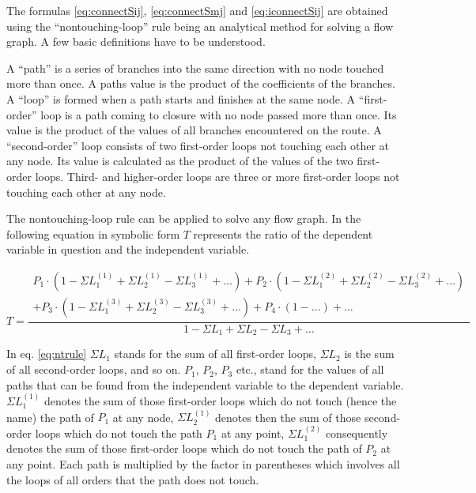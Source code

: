 \documentclass[10pt]{report}
\begin{document}
The formulas \eqref{eq:connectSij}, \eqref{eq:connectSmj} and
\eqref{eq:iconnectSij} are obtained using the ``nontouching-loop''
rule being an analytical method for solving a flow graph.  A few basic
definitions have to be understood.

\addvspace{12pt}

A ``path'' is a series of branches into the same direction with no
node touched more than once.  A paths value is the product of the
coefficients of the branches.  A ``loop'' is formed when a path starts
and finishes at the same node.  A ``first-order'' loop is a path
coming to closure with no node passed more than once.  Its value is
the product of the values of all branches encountered on the route.  A
``second-order'' loop consists of two first-order loops not touching
each other at any node.  Its value is calculated as the product of the
values of the two first-order loops.  Third- and higher-order loops
are three or more first-order loops not touching each other at any
node.

\addvspace{12pt}

The nontouching-loop rule can be applied to solve any flow graph.  In
the following equation in symbolic form $T$ represents the ratio of
the dependent variable in question and the independent variable.

\begin{equation}
T = \dfrac{
\begin{array}{r}
P_{1}\cdot\left(1 - \Sigma L_{1}^{(1)} + \Sigma L_{2}^{(1)} - \Sigma L_{3}^{(1)} + \ldots\right) +
P_{2}\cdot\left(1 - \Sigma L_{1}^{(2)} + \Sigma L_{2}^{(2)} - \Sigma L_{3}^{(2)} + \ldots\right)\\
+ P_{3}\cdot\left(1 - \Sigma L_{1}^{(3)} + \Sigma L_{2}^{(3)} - \Sigma L_{3}^{(3)} + \ldots\right) +
P_{4}\cdot\left(1 - \ldots\right) + \ldots
\end{array}
}{1 - \Sigma L_{1} + \Sigma L_{2} - \Sigma L_{3} + \ldots}
\label{eq:ntrule}
\end{equation}

In eq. \eqref{eq:ntrule} $\Sigma L_{1}$ stands for the sum of all
first-order loops, $\Sigma L_{2}$ is the sum of all second-order
loops, and so on.  $P_{1}$, $P_{2}$, $P_{3}$ etc., stand for the
values of all paths that can be found from the independent variable to
the dependent variable.  $\Sigma L_{1}^{(1)}$ denotes the sum of those
first-order loops which do not touch (hence the name) the path of
$P_{1}$ at any node, $\Sigma L_{2}^{(1)}$ denotes then the sum of
those second-order loops which do not touch the path $P_{1}$ at any
point, $\Sigma L_{1}^{(2)}$ consequently denotes the sum of those
first-order loops which do not touch the path of $P_{2}$ at any point.
Each path is multiplied by the factor in parentheses which involves
all the loops of all orders that the path does not touch.
\end{document}
